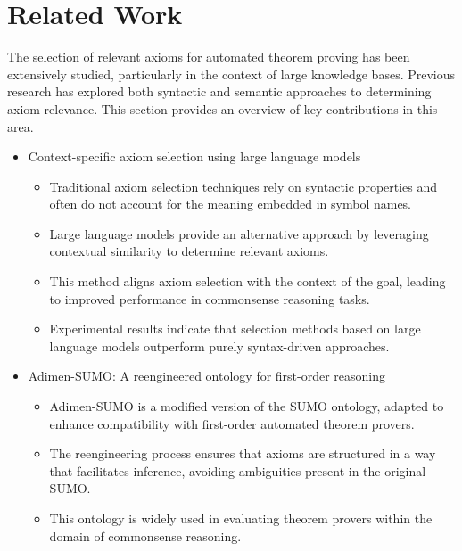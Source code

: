 \documentclass[english,version-2020-11]{uzl-thesis}
\begin{document}
\chapter{Related Work}
\label{chapter-relatedwork}

The selection of relevant axioms for automated theorem proving has been extensively studied, particularly in the context of large knowledge bases. Previous research has explored both syntactic and semantic approaches to determining axiom relevance. This section provides an overview of key contributions in this area.

\begin{itemize}
    \item Context-specific axiom selection using large language models \cite{Schon2024}
    \begin{itemize}
        \item Traditional axiom selection techniques rely on syntactic properties and often do not account for the meaning embedded in symbol names.
        \item Large language models provide an alternative approach by leveraging contextual similarity to determine relevant axioms.
        \item This method aligns axiom selection with the context of the goal, leading to improved performance in commonsense reasoning tasks.
        \item Experimental results indicate that selection methods based on large language models outperform purely syntax-driven approaches.
    \end{itemize}
    
    \item Adimen-SUMO: A reengineered ontology for first-order reasoning \cite{Alvez2014}
    \begin{itemize}
        \item Adimen-SUMO is a modified version of the SUMO ontology, adapted to enhance compatibility with first-order automated theorem provers.
        \item The reengineering process ensures that axioms are structured in a way that facilitates inference, avoiding ambiguities present in the original SUMO.
        \item This ontology is widely used in evaluating theorem provers within the domain of commonsense reasoning.
    \end{itemize}
    

\end{itemize}
\end{document}
